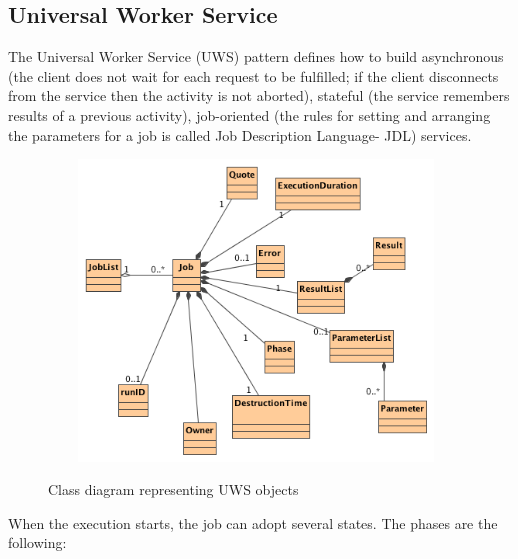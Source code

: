 \subsection{Universal Worker Service}

The Universal Worker Service (UWS) pattern defines how to build asynchronous (the client does not wait for each request to be fulfilled; if the client disconnects from the service then the activity is not aborted), stateful (the service remembers results of a previous activity), job-oriented (the rules for setting and arranging the parameters for a job is called Job Description Language- JDL) services.

\begin{figure}[H]
\centering
\includegraphics[width=11cm,height=8cm]{images/Class_Diagram__UWS__UWSObjects.png}\\
\caption{Class diagram representing UWS objects}
\end{figure}

When the execution starts, the job can adopt several states. The phases are the following:

